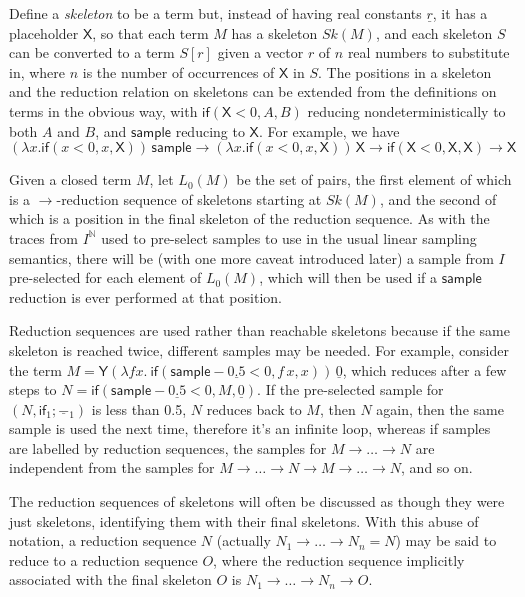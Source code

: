 \documentclass{article}
\newcommand{\tY}{\mathsf{Y}}
\newcommand{\tif}[3]{\mathsf{if}(#1, #2, #3)} %
\newcommand{\tsample}{\mathsf{sample}}
\newcommand{\skeletonPlaceholder}{\mathsf{X}} %
\theoremstyle{definition}
\theoremstyle{lemma}
\theoremstyle{remark}
\begin{document}
Define a \emph{skeleton} to be a term but, instead of having real constants $\underline r$, it has a placeholder $\skeletonPlaceholder$, so that each term $M$ has a skeleton $Sk(M)$, and each skeleton $S$ can be converted to a term $S[r]$ given a vector $r$ of $n$ real numbers to substitute in, where $n$ is the number of occurrences of $\skeletonPlaceholder$ in $S$.  
The positions in a skeleton and the reduction relation on skeletons can be extended from the definitions on terms in the obvious way, with $\tif{\skeletonPlaceholder < 0}{A}{B}$ reducing nondeterministically to both $A$ and $B$, and $\tsample$ reducing to $\skeletonPlaceholder$.
For example, we have 
\(
(\lambda x . \tif{x < 0}{x}{\skeletonPlaceholder}) \, \tsample
\to
(\lambda x . \tif{x < 0}{x}{\skeletonPlaceholder}) \, \skeletonPlaceholder
\to
\tif{\skeletonPlaceholder < 0}{\skeletonPlaceholder}{\skeletonPlaceholder}
\to
\skeletonPlaceholder
\)

Given a closed term $M$, let $L_0(M)$ be the set of pairs, the first element of which is a $\to$-reduction sequence of skeletons starting at $Sk(M)$, and the second of which is a position in the final skeleton of the reduction sequence. As with the traces from $I^{\mathbb N}$ used to pre-select samples to use in the usual linear sampling semantics, there will be (with one more caveat introduced later) a sample from $I$ pre-selected for each element of $L_0(M)$, which will then be used if a $\tsample$ reduction is ever performed at that position.

Reduction sequences are used rather than reachable skeletons because if the same skeleton is reached twice, different samples may be needed. For example, consider the term $M = \tY (\lambda f x.\ \tif{\tsample - \underline{0.5} < 0}{f \, x}{x}) \, \underline 0$, which reduces after a few steps to $N = \tif{\tsample - \underline{0.5}  < 0}{M}{\underline 0}$. If the pre-selected sample for $(N,\textsf{if}_1;\underline{-}_1)$ is less than 0.5, $N$ reduces back to $M$, then $N$ again, then the same sample is used the next time, therefore it's an infinite loop, whereas if samples are labelled by reduction sequences, the samples for $M \to \dots \to N$ are independent from the samples for $M \to \dots \to N \to M \to \dots \to N$, and so on.

The reduction sequences of skeletons will often be discussed as though they were just skeletons, identifying them with their final skeletons. With this abuse of notation, a reduction sequence $N$ (actually $N_1 \to \dots \to N_n = N$) may be said to reduce to a reduction sequence $O$, where the reduction sequence implicitly associated with the final skeleton $O$ is $N_1 \to \dots \to N_n \to O$.
\end{document}
